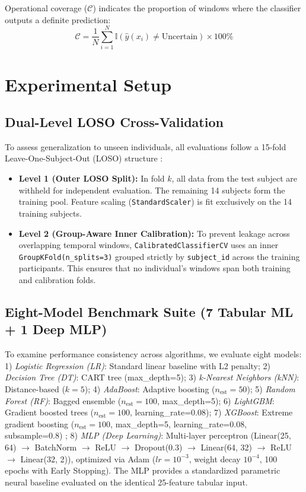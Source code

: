 \documentclass[conference]{IEEEtran}
\begin{document}
Operational coverage ($\mathcal{C}$) indicates the proportion of windows where the classifier outputs a definite prediction:
\begin{equation}
\mathcal{C} = \frac{1}{N} \sum_{i=1}^N \mathbb{I}(\hat{y}(x_i) \neq \text{Uncertain}) \times 100\%
\end{equation}

\section{Experimental Setup}

\subsection{Dual-Level LOSO Cross-Validation}
To assess generalization to unseen individuals, all evaluations follow a 15-fold Leave-One-Subject-Out (LOSO) structure \cite{saeb2017need, little2019using}:
\begin{itemize}
    \item \textbf{Level 1 (Outer LOSO Split):} In fold $k$, all data from the test subject are withheld for independent evaluation. The remaining 14 subjects form the training pool. Feature scaling (\texttt{StandardScaler}) is fit exclusively on the 14 training subjects.
    \item \textbf{Level 2 (Group-Aware Inner Calibration):} To prevent leakage across overlapping temporal windows, \texttt{CalibratedClassifierCV} uses an inner \texttt{GroupKFold(n\_splits=3)} grouped strictly by \texttt{subject\_id} across the training participants. This ensures that no individual's windows span both training and calibration folds.
\end{itemize}

\subsection{Eight-Model Benchmark Suite (7 Tabular ML + 1 Deep MLP)}
To examine performance consistency across algorithms, we evaluate eight models:
1) \textit{Logistic Regression (LR)}: Standard linear baseline with L2 penalty;
2) \textit{Decision Tree (DT)}: CART tree (max\_depth=5);
3) \textit{k-Nearest Neighbors (kNN)}: Distance-based ($k=5$);
4) \textit{AdaBoost}: Adaptive boosting ($n_{\text{est}}=50$);
5) \textit{Random Forest (RF)}: Bagged ensemble ($n_{\text{est}}=100$, max\_depth=5);
6) \textit{LightGBM}: Gradient boosted trees ($n_{\text{est}}=100$, learning\_rate=0.08);
7) \textit{XGBoost}: Extreme gradient boosting ($n_{\text{est}}=100$, max\_depth=5, learning\_rate=0.08, subsample=0.8) \cite{chen2016xgboost};
8) \textit{MLP (Deep Learning)}: Multi-layer perceptron (Linear(25, 64) $\rightarrow$ BatchNorm $\rightarrow$ ReLU $\rightarrow$ Dropout(0.3) $\rightarrow$ Linear(64, 32) $\rightarrow$ ReLU $\rightarrow$ Linear(32, 2)), optimized via Adam ($lr=10^{-3}$, weight decay $10^{-4}$, 100 epochs with Early Stopping). The MLP provides a standardized parametric neural baseline evaluated on the identical 25-feature tabular input.
\end{document}
